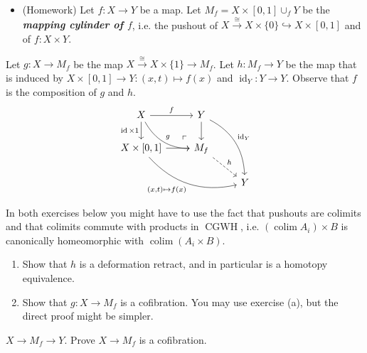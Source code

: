 \documentclass{article}
\DeclareMathOperator{\id}{id}
\DeclareMathOperator{\CGWH}{CGWH}
\DeclareMathOperator{\colim}{colim}
\begin{document}
\begin{defn}
\begin{itemize}
	\begin{quote}
		{\color{persiangreen}(Dani) So the mapping cylinder is just deforming $X$ to $Y$ putting $X$ inside $Y$ via $f$.}
	\end{quote}
	
	\item (Homework) Let $f:X\to Y$ be a map. Let $M_f=X\times[0,1]\cup_fY$ be the \textbf{\textit{mapping cylinder of $f$}}, i.e. the pushout of $X\overset{\cong}{\to}X\times\{0\}\hookrightarrow X\times[0,1]$ and of $f:X\times Y$.
	
	
	\end{itemize}
\end{defn}
\begin{exercise}
	Let $g:X\to M_f$ be the map $X\overset{\cong}{\to}X\times\{1\}\to M_f$. Let $h:M_f\to Y$ be the map that is induced by $X\times[0,1]\to Y:(x,t)\mapsto f(x)$ and $\id_Y:Y\to Y$. Observe that $f$ is the composition of $g$ and $h$.
	\[\begin{tikzcd}
		X\arrow[r,"f"]\arrow[d,swap,"\id\times 1"]\arrow[rd,bend right,"g"]&Y\arrow[d]\arrow[ddr,bend left,"\id_Y"]\\
		X\times[0,1]\arrow[r,swap]\arrow[drr,bend right,swap,"(x\text{,}t)\mapsto f(x)"]&M_f\arrow[ul, phantom, "\ulcorner", very near start]\arrow[dr,dashed,"h"]\\
		&&Y
	\end{tikzcd}\]
	
	In both exercises below you might have to use the fact that pushouts are colimits and that colimits commute with products in $\CGWH$, i.e. $(\colim A_i)\times B$ is canonically homeomorphic with $\colim(A_i \times B)$.
	\begin{enumerate}
		\item Show that $h$ is a deformation retract, and in particular is a homotopy equivalence.
		\item Show that $g : X \to M_f$ is a cofibration. You may use exercise (a), but the direct proof might be simpler.
	\end{enumerate}
\end{exercise}
\begin{exercise}
	$X\to M_f\to Y$. Prove $X\to M_f$ is a cofibration.
\end{exercise}
\end{document}
